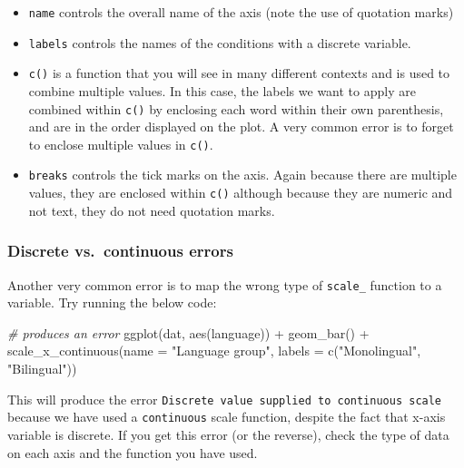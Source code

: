 \documentclass[
  english,
  doc,floatsintext]{apa6}
\newenvironment{Shaded}{\begin{snugshade}}{\end{snugshade}}
\newcommand{\AttributeTok}[1]{\textcolor[rgb]{0.77,0.63,0.00}{#1}}
\newcommand{\CommentTok}[1]{\textcolor[rgb]{0.56,0.35,0.01}{\textit{#1}}}
\newcommand{\FunctionTok}[1]{\textcolor[rgb]{0.00,0.00,0.00}{#1}}
\newcommand{\NormalTok}[1]{#1}
\newcommand{\SpecialCharTok}[1]{\textcolor[rgb]{0.00,0.00,0.00}{#1}}
\newcommand{\StringTok}[1]{\textcolor[rgb]{0.31,0.60,0.02}{#1}}
\begin{document}
\begin{itemize}
\item
  \texttt{name} controls the overall name of the axis (note the use of quotation marks)
\item
  \texttt{labels} controls the names of the conditions with a discrete variable.
\item
  \texttt{c()} is a function that you will see in many different contexts and is used to combine multiple values. In this case, the labels we want to apply are combined within \texttt{c()} by enclosing each word within their own parenthesis, and are in the order displayed on the plot. A very common error is to forget to enclose multiple values in \texttt{c()}.
\item
  \texttt{breaks} controls the tick marks on the axis. Again because there are multiple values, they are enclosed within \texttt{c()} although because they are numeric and not text, they do not need quotation marks.
\end{itemize}

\hypertarget{discrete-vs.-continuous-errors}{%
\subsubsection{Discrete vs.~continuous errors}\label{discrete-vs.-continuous-errors}}

Another very common error is to map the wrong type of \texttt{scale\_} function to a variable. Try running the below code:

\begin{Shaded}
\begin{Highlighting}[]
\CommentTok{\# produces an error}
\FunctionTok{ggplot}\NormalTok{(dat, }\FunctionTok{aes}\NormalTok{(language)) }\SpecialCharTok{+}
  \FunctionTok{geom\_bar}\NormalTok{() }\SpecialCharTok{+}
  \FunctionTok{scale\_x\_continuous}\NormalTok{(}\AttributeTok{name =} \StringTok{"Language group"}\NormalTok{, }
                   \AttributeTok{labels =} \FunctionTok{c}\NormalTok{(}\StringTok{"Monolingual"}\NormalTok{, }\StringTok{"Bilingual"}\NormalTok{)) }
\end{Highlighting}
\end{Shaded}

This will produce the error \texttt{Discrete\ value\ supplied\ to\ continuous\ scale} because we have used a \texttt{continuous} scale function, despite the fact that x-axis variable is discrete. If you get this error (or the reverse), check the type of data on each axis and the function you have used.
\end{document}

